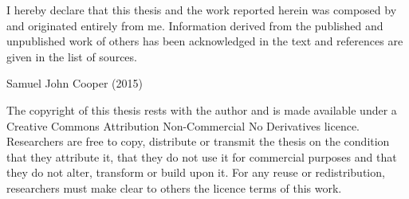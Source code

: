 \vspace*{\fill}
\begin{center}
I hereby declare that this thesis and the work reported herein was composed by and originated entirely from me. Information derived from the published and unpublished work of others has been acknowledged in the text and references are given in the list of sources.

\begin{flushright}
Samuel John Cooper (2015)
\end{flushright}
\end{center}
\vspace*{\fill}

The copyright of this thesis rests with the author and is made available under a Creative Commons Attribution Non-Commercial No Derivatives licence. Researchers are free to copy, distribute or transmit the thesis on the condition that they attribute it, that they do not use it for commercial purposes and that they do not alter, transform or build upon it. For any reuse or redistribution, researchers must make clear to others the licence terms of this work.
